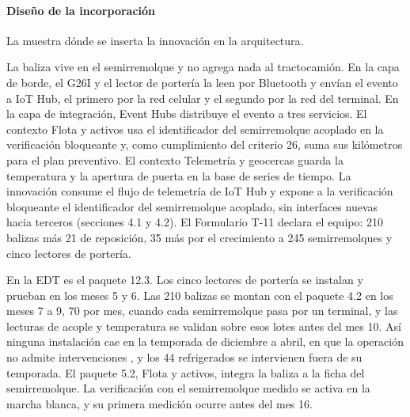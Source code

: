 \paragraph{Diseño de la incorporación} La  muestra dónde se inserta la
innovación en la arquitectura.


La baliza vive en el semirremolque y no agrega nada al tractocamión. En la capa de borde, el G26I y el
lector de portería la leen por Bluetooth y envían el evento a IoT Hub, el primero por la red celular y
el segundo por la red del terminal. En la capa de integración, Event Hubs distribuye el evento a tres
servicios. El contexto Flota y activos usa el identificador del semirremolque acoplado en la
verificación bloqueante y, como cumplimiento del criterio 26, suma sus kilómetros para el plan
preventivo. El contexto Telemetría y
geocercas guarda la temperatura y la apertura de puerta en la base de series de tiempo. La innovación
consume el flujo de telemetría de IoT Hub y expone a la verificación bloqueante el identificador del
semirremolque acoplado, sin interfaces nuevas hacia terceros (secciones 4.1 y 4.2). El Formulario T-11
declara el equipo: 210 balizas más 21 de reposición, 35 más por el crecimiento a 245 semirremolques y
cinco lectores de portería.

En la EDT es el paquete 12.3. Los cinco lectores de portería se instalan y prueban en los meses 5 y 6.
Las 210 balizas se montan con el paquete 4.2 en los meses 7 a 9, 70 por mes, cuando cada semirremolque
pasa por un terminal, y las lecturas de acople y temperatura se validan sobre esos lotes antes del
mes 10. Así ninguna instalación cae en la temporada de diciembre a abril, en que la operación no admite
intervenciones , y los 44 refrigerados se intervienen fuera de su temporada. El
paquete 5.2, Flota y activos, integra la baliza a la ficha del semirremolque. La verificación con el
semirremolque medido se activa en la marcha blanca, y su primera medición ocurre antes del mes 16.

